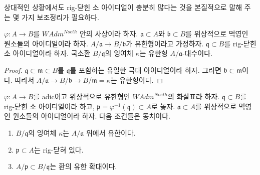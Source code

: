 \noindent
상대적인 상황에서도 rig-닫힌 소 아이디얼이 충분히 많다는 것을 본질적으로
말해 주는 몇 가지 보조정리가 필요하다.

\begin{lemma}
\label{lemma-rig-closed-point-relative-residue-field}
$\varphi : A \to B$를 $\textit{WAdm}^{Noeth}$ 안의 사상이라 하자.
$\mathfrak a \subset A$와 $\mathfrak b \subset B$를
위상적으로 멱영인 원소들의 아이디얼이라 하자.
$A/\mathfrak a \to B/\mathfrak b$가 유한형이라고 가정하자.
$\mathfrak q \subset B$를 rig-닫힌 소 아이디얼이라 하자.
국소환 $B/\mathfrak q$의 잉여체 $\kappa$는 유한형 $A/\mathfrak a$-대수이다.
\end{lemma}

\begin{proof}
$\mathfrak q \subset \mathfrak m \subset B$를 $\mathfrak q$를 포함하는
유일한 극대 아이디얼이라 하자. 그러면 $\mathfrak b \subset \mathfrak m$이다.
따라서 $A/\mathfrak a \to B/\mathfrak b \to B/\mathfrak m = \kappa$는 유한형이다.
\end{proof}

\begin{lemma}
\label{lemma-rig-closed-point-relative}
$\varphi : A \to B$를 adic이고 위상적으로 유한형인
$\textit{WAdm}^{Noeth}$의 화살표라 하자.
$\mathfrak q \subset B$를 rig-닫힌 소 아이디얼이라 하고,
$\mathfrak p = \varphi^{-1}(\mathfrak q) \subset A$로 놓자.
$\mathfrak a \subset A$를 위상적으로 멱영인 원소들의 아이디얼이라 하자.
다음 조건들은 동치이다.
\begin{enumerate}
\item $B/\mathfrak q$의 잉여체 $\kappa$는 $A/\mathfrak a$ 위에서 유한이다.
\item $\mathfrak p \subset A$는 rig-닫혀 있다.
\item $A/\mathfrak p \subset B/\mathfrak q$는 환의 유한 확대이다.
\end{enumerate}
\end{lemma}

